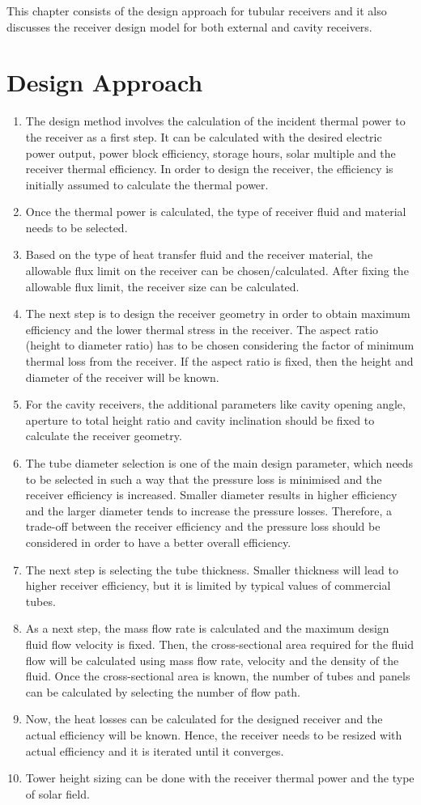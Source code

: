 This chapter consists of the design approach for tubular receivers and it also discusses the receiver design model for both external and cavity receivers.
\section{Design Approach}
\begin{enumerate}
	\item The design method involves the calculation of the incident thermal power to the receiver as a first step. It can be calculated with the desired electric power output, power block efficiency, storage hours, solar multiple and the receiver thermal efficiency. In order to design the receiver, the efficiency is initially assumed to calculate the thermal power.
	\item Once the thermal power is calculated, the type of receiver fluid and material needs to be selected.
	\item Based on the type of heat transfer fluid and the receiver material, the allowable flux limit on the receiver can be chosen/calculated. After fixing the allowable flux limit, the receiver size can be calculated.
	\item The next step is to design the receiver geometry in order to obtain maximum efficiency and the lower thermal stress in the receiver. The aspect ratio (height to diameter ratio) has to be chosen considering the factor of minimum thermal loss from the receiver. If the aspect ratio is fixed, then the height and diameter of the receiver will be known.
	\item For the cavity receivers, the additional parameters like cavity opening angle, aperture to total height ratio and cavity inclination should be fixed to calculate the receiver geometry.
	\item The tube diameter selection is one of the main design parameter, which needs to be selected in such a way that the pressure loss is minimised and the receiver efficiency is increased. Smaller diameter results in higher efficiency and the larger diameter tends to increase the pressure losses. Therefore, a trade-off between the receiver efficiency and the pressure loss should be considered in order to have a better overall efficiency.
	\item The next step is selecting the tube thickness. Smaller thickness will lead to higher receiver efficiency, but it is limited by typical values of commercial tubes.
	\item As a next step, the mass flow rate is calculated and the maximum design fluid flow velocity is fixed. Then, the cross-sectional area required for the fluid flow will be calculated using mass flow rate, velocity and the density of the fluid. Once the cross-sectional area is known, the number of tubes and panels can be calculated by selecting the number of flow path.
	\item Now, the heat losses can be calculated for the designed receiver and the actual efficiency will be known. Hence, the receiver needs to be resized with actual efficiency and it is iterated until it converges.
	\item Tower height sizing can be done with the receiver thermal power and the type of solar field.
\end{enumerate}
